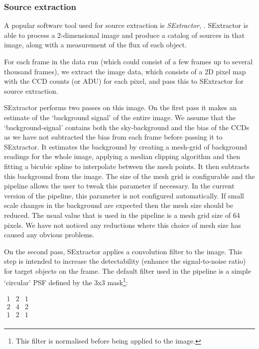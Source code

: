 \subsubsection{Source extraction}
A popular software tool used for source extraction is \emph{SExtractor}, \citep{bertin}. SExtractor is able to process a 2-dimensional image and produce a catalog of sources in that image, along with a measurement of the flux of each object. 

For each frame in the data run (which could consist of a few frames up to several thousand frames), we extract the image data, which consists of a 2D pixel map with the CCD counts (or ADU) for each pixel, and pass this to SExtractor for source extraction. 

SExtractor performs two passes on this image. On the first pass it makes an estimate of the `background signal' of the entire image. We assume that the `background-signal' contains both the sky-background and the bias of the CCDs as we have not subtracted the bias from each frame before passing it to SExtractor. It estimates the background by creating a mesh-grid of background readings for the whole image, applying a median clipping algorithm and then fitting a bicubic spline to interpolate between the mesh points. It then subtracts this background from the image. The size of the mesh grid is configurable and the pipeline allows the user to tweak this parameter if necessary. In the current version of the pipeline, this parameter is not configured automatically.  If small scale changes in the background are expected then the mesh size should be reduced. The usual value that is used in the pipeline is a mesh grid size of 64 pixels. We have not noticed any reductions where this choice of mesh size has caused any obvious problems. 

On the second pass, SExtractor applies a convolution filter to the image. This step is intended to increase the detectability (enhance the signal-to-noise ratio) for target objects on the frame. The default filter used in the pipeline is a simple `circular' PSF defined by the 3x3 mask\footnote{This filter is normalised before being applied to the image.}:

$
\begin{array}{ccc}
  1 & 2 & 1 \\
  2 & 4 & 2 \\
  1 & 2 & 1 \\
\end{array}  
$




